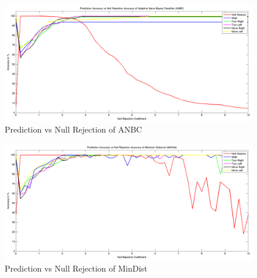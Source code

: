 \begin{figure}
	[h]
	\hspace{-15 mm}
	\includegraphics[width=185mm]{figures/result/test-accuracy-anbc.png}
	\caption{Prediction vs Null Rejection of ANBC}
	\label{ev:accuracy:anbc}
\end{figure}
\begin{figure} 	
	[h]
	\hspace{-15 mm}
	\includegraphics[width=185mm]{figures/result/test-accuracy-mindist.png}
	\caption{Prediction vs Null Rejection of MinDist}
	\label{ev:accuracy:mindist}
\end{figure}